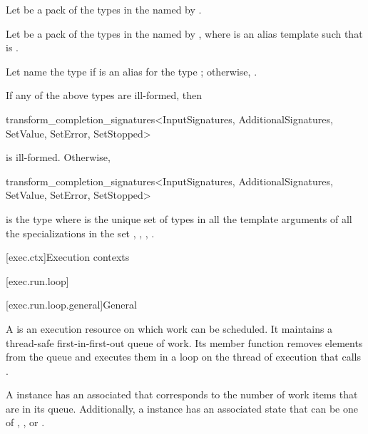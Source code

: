\pnum
Let  be a pack of the types in the  named by
.

\pnum
Let  be a pack of the types in the  named by
,
where  is an alias template
such that  is
.

\pnum
Let  name the type  if
is an alias for the type ;
otherwise, .

\pnum
If any of the above types are ill-formed,
then
\begin{codeblock}
transform_completion_signatures<InputSignatures, AdditionalSignatures,
                                SetValue, SetError, SetStopped>
\end{codeblock}
is ill-formed.
Otherwise,
\begin{codeblock}
transform_completion_signatures<InputSignatures, AdditionalSignatures,
                                SetValue, SetError, SetStopped>
\end{codeblock}
is the type 
where  is the unique set of types in all the template arguments
of all the  specializations in the set
, , , .

[exec.ctx]{Execution contexts}

[exec.run.loop]{}

[exec.run.loop.general]{General}

\pnum
A  is an execution resource on which work can be scheduled.
It maintains a thread-safe first-in-first-out queue of work.
Its  member function removes elements from the queue and
executes them in a loop on the thread of execution that calls .

\pnum
A  instance has an associated 
that corresponds to the number of work items that are in its queue.
Additionally, a  instance has an associated state
that can be one of , , or .

